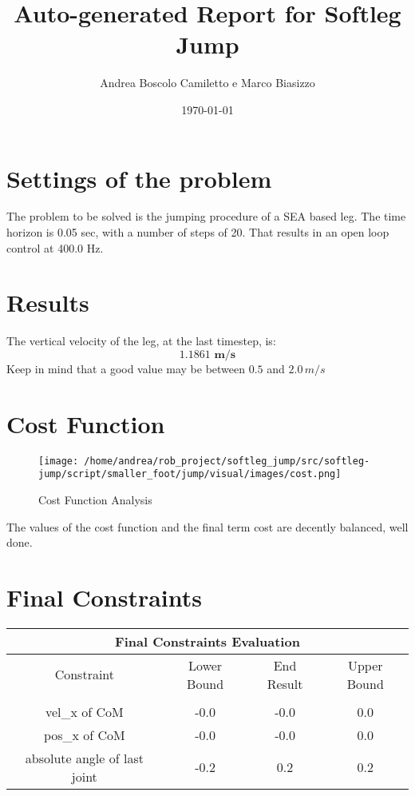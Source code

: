 \documentclass{article}%
\title{Auto{-}generated Report for Softleg Jump}%
\author{Andrea Boscolo Camiletto e Marco Biasizzo}%
\date{\today}%
\begin{document}
%
\normalsize%
\maketitle%
\section{Settings of the problem}%
\label{sec:Settingsoftheproblem}%
The problem to be solved is the jumping procedure of a SEA based leg.%
The time horizon is 0.05 sec, with a number of steps of 20. That results in an open loop control at 400.0 Hz.

%
\section{Results}%
\label{sec:Results}%
The vertical velocity of the leg, at the last timestep, is:%
\[%
\boldsymbol{1.1861\,\, m/s}%
\]%
Keep in mind that a good value may be between $0.5$ and $2.0 \, m/s$

%
\section{Cost Function}%
\label{sec:CostFunction}%


\begin{figure}[h!]%
\centering%
\texttt{[image: /home/andrea/rob\_project/softleg\_jump/src/softleg-jump/script/smaller\_foot/jump/visual/images/cost.png]}%
\caption{Cost Function Analysis}%
\end{figure}

%
%
The values of the cost function and the final term cost are decently balanced, well done.

%
\pagebreak%
\section{Final Constraints}%
\label{sec:FinalConstraints}%
\begin{center}%
\begin{tabular}{c|c|c|c}%
\hline%
\multicolumn{4}{|c|}{Final Constraints Evaluation}\\%
\hline%
Constraint&Lower Bound&End Result&Upper Bound\\%
\hline%
&&&\\%
\multirow{1}{*}{vel\_x of CoM}&{-}0.0&{-}0.0&0.0\\%
\hline%
\multirow{1}{*}{pos\_x of CoM}&{-}0.0&{-}0.0&0.0\\%
\hline%
\multirow{1}{*}{absolute angle of last joint}&{-}0.2&0.2&0.2\\%
\hline%
\end{tabular}%
\end{center}
\end{document}
